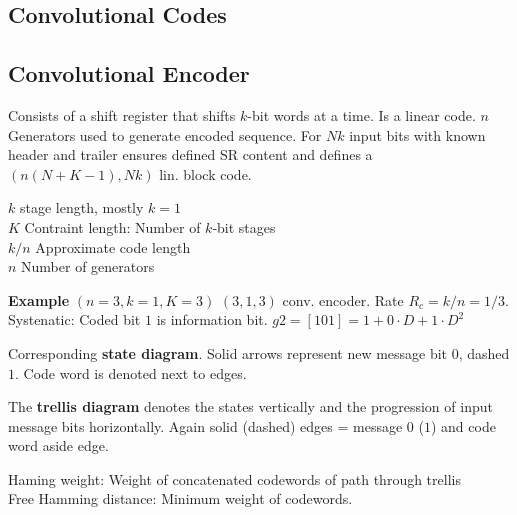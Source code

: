 \documentclass[a4paper, fontsize=8pt, landscape, DIV=1]{scrartcl}
\begin{document}
\begin{multicols*}{4}
  \section{Convolutional Codes}
  \subsection{Convolutional Encoder}
  Consists of a shift register that shifts $k$-bit words at a time. Is a linear
  code. $n$ Generators used to generate encoded sequence. For $Nk$ input bits
  with known header and trailer ensures defined SR content and defines a
  $(n(N+K-1), Nk)$ lin. block code.
  
  $k$ stage length, mostly $k=1$ \\
  $K$ Contraint length: Number of $k$-bit stages \\
  $k/n$ Approximate code length \\
  $n$ Number of generators

  \textbf{Example} $(n=3,k=1,K=3)$ $(3,1,3)$ conv. encoder. Rate $R_c=k/n=1/3$. Systenatic: 
  Coded bit $1$ is information bit. $g2=[1 0 1]=1+0\cdot D+1\cdot D^2$

  Corresponding \textbf{state diagram}. Solid arrows represent new message bit $0$, 
  dashed $1$. Code word is denoted next to edges.

  The \textbf{trellis diagram} denotes the states vertically and the progression of
  input message bits horizontally. Again solid (dashed) edges = message $0$ ($1$)
  and code word aside edge.

  Haming weight: Weight of concatenated codewords of path through trellis\\
  Free Hamming distance: Minimum weight of codewords.


\end{multicols*}
\end{document}
